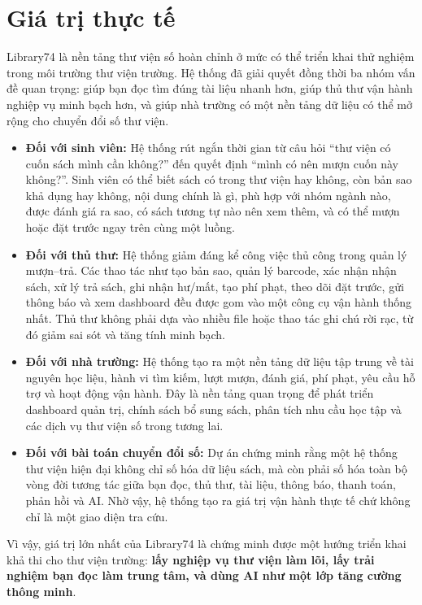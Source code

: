 \section{Giá trị thực tế}
Library74 là nền tảng thư viện số hoàn chỉnh ở mức có thể triển khai thử nghiệm trong môi trường thư viện trường. Hệ thống đã giải quyết đồng thời ba nhóm vấn đề quan trọng: giúp bạn đọc tìm
đúng tài liệu nhanh hơn, giúp thủ thư vận hành nghiệp vụ minh bạch hơn, và giúp nhà trường có một nền tảng
dữ liệu có thể mở rộng cho chuyển đổi số thư viện.
\begin{itemize}
    \item \textbf{Đối với sinh viên:} Hệ thống rút ngắn thời gian từ câu hỏi
    ``thư viện có cuốn sách mình cần không?'' đến quyết định ``mình có nên mượn
    cuốn này không?''. Sinh viên có thể biết sách có trong thư viện hay không,
    còn bản sao khả dụng hay không, nội dung chính là gì, phù hợp với nhóm ngành
    nào, được đánh giá ra sao, có sách tương tự nào nên xem thêm, và có thể mượn
    hoặc đặt trước ngay trên cùng một luồng.

    \item \textbf{Đối với thủ thư:} Hệ thống giảm đáng kể công việc thủ công
    trong quản lý mượn--trả. Các thao tác như tạo bản sao, quản lý barcode, xác
    nhận nhận sách, xử lý trả sách, ghi nhận hư/mất, tạo phí phạt, theo dõi đặt
    trước, gửi thông báo và xem dashboard đều được gom vào một công cụ vận hành
    thống nhất. Thủ thư không phải dựa vào nhiều file hoặc thao tác ghi chú rời
    rạc, từ đó giảm sai sót và tăng tính minh bạch.

    \item \textbf{Đối với nhà trường:} Hệ thống tạo ra một nền tảng dữ liệu tập
    trung về tài nguyên học liệu, hành vi tìm kiếm, lượt mượn, đánh giá, phí
    phạt, yêu cầu hỗ trợ và hoạt động vận hành. Đây là nền tảng quan trọng để
    phát triển dashboard quản trị, chính sách bổ sung sách, phân tích nhu cầu
    học tập và các dịch vụ thư viện số trong tương lai.

    \item \textbf{Đối với bài toán chuyển đổi số:} Dự án chứng minh rằng một hệ
    thống thư viện hiện đại không chỉ số hóa dữ liệu sách, mà còn phải số hóa
    toàn bộ vòng đời tương tác giữa bạn đọc, thủ thư, tài liệu, thông báo, thanh
    toán, phản hồi và AI. Nhờ vậy, hệ thống tạo ra giá trị vận hành thực tế chứ
    không chỉ là một giao diện tra cứu.
\end{itemize}
Vì vậy, giá trị lớn nhất của Library74 là chứng minh được một hướng triển khai khả
thi cho thư viện trường: \textbf{lấy nghiệp vụ thư viện làm lõi, lấy trải nghiệm
bạn đọc làm trung tâm, và dùng AI như một lớp tăng cường thông minh}.
